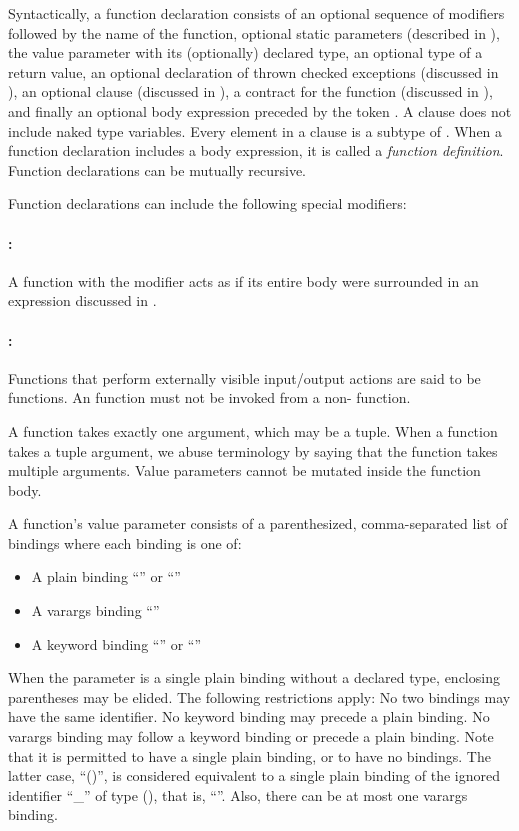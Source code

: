 Syntactically, a function declaration consists of
an optional sequence of modifiers followed by
the name of the function, optional static parameters
(described in ),
the value parameter with its (optionally) declared type,
an optional type of a return value,
an optional declaration of thrown checked exceptions
(discussed in ),
an optional  clause (discussed in ),
a contract for the function (discussed in ),
and finally an optional body expression preceded by the token \EXP{=}.
A  clause does not include naked type variables.
Every element in a  clause is a subtype of
.
When a function declaration includes a body expression, it is called a
\emph{function definition}.
Function declarations can be mutually recursive.

Function declarations can include the following special modifiers:
\paragraph{:}
A function with the modifier  acts as if its entire
body were surrounded in an  expression discussed in
.

\paragraph{:}
Functions that perform externally visible input/output actions
are said to be  functions.
An  function must not be invoked from a non- function.

A function takes exactly one argument, which may be a tuple.
When a function takes a tuple argument, we abuse terminology by saying that
the function takes multiple arguments.
Value parameters cannot be mutated inside the function body.

A function's value parameter consists of a parenthesized,
comma-separated list of bindings where each binding is one of:
\begin{itemize}
\item A plain binding ``''
or ``''
\item A varargs binding ``''
\item A keyword binding ``''
or ``''
\end{itemize}
When the parameter is a single plain binding without a declared type,
enclosing parentheses may be elided.
The following restrictions apply:  No two bindings may have the same
    identifier.
No keyword binding may precede a plain binding.
No varargs binding may follow a keyword binding or precede a plain binding.
Note that it is permitted to have a single plain binding,
or to have no bindings.  The latter case, ``()'', is considered equivalent
to a single plain binding of the ignored identifier ``\_'' of type (), that
is, ``\EXP{(\_\COLONOP())}''.
Also, there can be at most one varargs binding.

